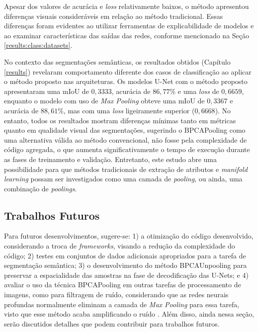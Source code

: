 Apesar dos valores de acurácia e \textit{loss} relativamente baixos, o método apresentou diferenças visuais consideráveis em relação ao método tradicional. Essas diferenças foram evidentes ao utilizar ferramentas de explicabilidade de modelos e ao examinar características das saídas das redes, conforme mencionado na Seção \ref{results:class:datasets}.

No contexto das segmentações semânticas, os resultados obtidos (Capítulo \ref{results}) revelaram comportamento diferente dos casos de classificação ao aplicar o método proposto nas arquiteturas. Os modelos U-Net com o método proposto apresentaram uma mIoU de $0,3333$, acurácia de $86,77\%$ e uma \textit{loss} de $0,6659$, enquanto o modelo com uso de \textit{Max Pooling} obteve uma mIoU de $0,3367$ e acurácia de $88,61\%$, mas com uma \textit{loss} ligeiramente superior ($0,6668$). No entanto, todos os resultados mostram diferenças mínimas tanto em métricas quanto em qualidade visual das segmentações, sugerindo o BPCAPooling como uma alternativa válida ao método convencional, não fosse pela complexidade de código agregada, o que aumenta significativamente o tempo de execução durante as fases de treinamento e validação. Entretanto, este estudo abre uma possibilidade para que métodos tradicionais de extração de atributos e \textit{manifold learning} possam ser investigados como uma camada de \textit{pooling}, ou ainda, uma combinação de \textit{poolings}.


\subsection{Trabalhos Futuros}
\label{conclusion:future}
Para futuros desenvolvimentos, sugere-se: 1) a otimização do código desenvolvido, considerando a troca de \textit{frameworks}, visando a redução da complexidade do código; 2) testes em conjuntos de dados adicionais apropriados para a tarefa de segmentação semântica; 3) o desenvolvimento do método BPCAUnpooling para preservar a espacialidade das amostras na fase de decodificação das U-Nets; e 4) avaliar o uso da técnica BPCAPooling em outras tarefas de processamento de imagens, como para filtragem de ruído, considerando que as redes neurais profundas normalmente eliminam a camada de \textit{Max Pooling} para essa tarefa, visto que esse método acaba amplificando o ruído \citep{zhang2017beyond}. Além disso, ainda nessa seção, serão discutidos detalhes que podem contribuir para trabalhos futuros.

